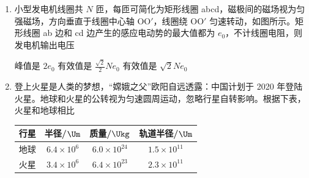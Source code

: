 \documentclass[\gkver]{gaokaozhenti}
\begin{document}
\begin{enumerate}

\item
小型发电机线圈共 $N$ 匝，每匝可简化为矩形线圈 abcd，磁极间的磁场视为匀强磁场，方向垂直于线圈中心轴 OO$'$，线圈绕 OO$'$ 匀速转动，如图所示。矩形线圈 ab 边和 cd 边产生的感应电动势的最大值都为 $e_{0}$，不计线圈电阻，则发电机输出电压


{峰值是 $2e_{0}$}
{有效值是 $\frac{\sqrt{2}}{2}Ne_{0}$}
{有效值是 $\sqrt{2}Ne_{0}$}


\item
登上火星是人类的梦想，“嫦娥之父”欧阳自远透露：中国计划于 2020 年登陆火星。地球和火星的公转视为匀速圆周运动，忽略行星自转影响。根据下表，火星和地球相比

\begin{center}
\begin{tabular}{|c|c|c|c|}
\hline
行星 & 半径/$\Um$ & 质量/$\Ukg$ & 轨道半径/$\Um$ \\
\hline
地球 & $6.4\times10^{6}$ & $6.0\times10^{24}$ & $1.5\times10^{11}$ \\
\hline
火星 & $3.4\times10^{6}$ & $6.4\times10^{23}$ & $2.3\times10^{11}$ \\
\hline
\end{tabular}
\end{center}


\end{enumerate}
\end{document}
